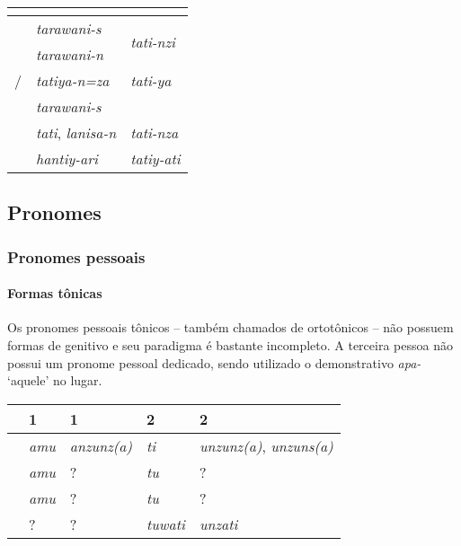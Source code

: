 \begin{center}
	\begin{tabular}[c]{lll}
		\toprule
		                      & \Sg{}\emph{}                 & \Pl{}\emph{}                       \\
		\midrule
		\Nom{} \Com{}         & \emph{tarawani-s}            & \multirow{2}{4em}{\emph{tati-nzi}} \\
		\Acu{} \Com{}         & \emph{tarawani-n}            &                                    \\
		\Nom{}/\Acu{} \Neut{} & \emph{tatiya-n=za}           & \emph{tati-ya}                     \\
		\Gen{}                & \emph{tarawani-s}            &                                    \\
		\Dat{}                & \emph{tati}, \emph{lanisa-n} & \emph{tati-nza}                    \\
		\Abl{}                & \emph{hantiy-ari}            & \emph{tatiy-ati}                   \\
		\bottomrule
	\end{tabular}
\end{center}


\subsection{Pronomes}

\subsubsection{Pronomes pessoais}

\paragraph{Formas tônicas}
Os pronomes pessoais tônicos -- também chamados de
ortotônicos -- não possuem formas de genitivo e seu paradigma é bastante
incompleto. A terceira pessoa não possui um pronome pessoal dedicado, sendo
utilizado o demonstrativo \emph{apa-} `aquele' no lugar.


\begin{center}
	\begin{tabular}[c]{lll|ll}
		\toprule
		       & 1\Sg{}\emph{} & 1\Pl{}\emph{}      & 2\Sg{}\emph{} & 2\Pl{}\emph{}                          \\
		\midrule
		\Nom{} & \emph{amu}    & \emph{anzunz{(a)}} & \emph{ti}     & \emph{unzunz{(a)}}, \emph{unzuns{(a)}} \\
		\Acu{} & \emph{amu}    & {?}\emph{}         & \emph{tu}     & {?}\emph{}                             \\
		\Dat{} & \emph{amu}    & {?}\emph{}         & \emph{tu}     & {?}\emph{}                             \\
		\Abl{} & {?}\emph{}    & {?}\emph{}         & \emph{tuwati} & \emph{unzati}                          \\
		\bottomrule
	\end{tabular}
\end{center}


